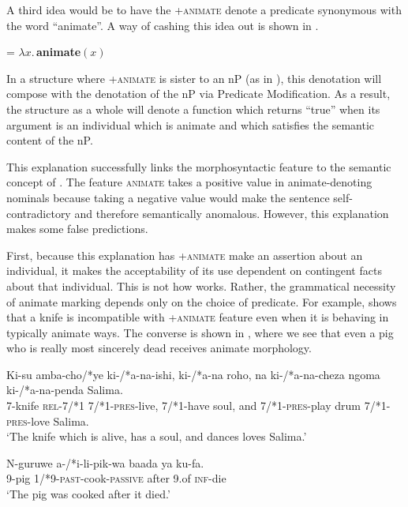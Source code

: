 \documentclass[output=paper,newtxmath,modfonts,nonflat,hidelinks]{langsci/langscibook}
\begin{document}
A third idea would be to have the +\textsc{animate} denote a predicate synonymous with the word ``animate''.  A way of cashing this idea out is shown in .

\ea\label{ex:pesetsky:lambdabdas}  = $\lambda x . \,$\textbf{animate}$(x)$ \z

In a structure where +\textsc{animate} is sister to an nP (as in ), this denotation will compose with the denotation of the nP via Predicate Modification.  As a result, the structure as a whole will denote a function which returns ``true'' when its argument is an individual which is animate and which satisfies the semantic content of the nP. 

This explanation successfully links the morphosyntactic  feature to the semantic concept of .  The feature \textsc{animate} takes a positive value in animate-denoting nominals because taking a negative value would make the sentence self-contradictory and therefore semantically anomalous.  However, this explanation makes some false predictions.

\largerpage
First, because this explanation has +\textsc{animate} make an assertion about an individual, it makes the acceptability of its use dependent on contingent facts about that individual.  This is not how  works.  Rather, the grammatical necessity of animate marking depends only on the choice of predicate. For example,  shows that a knife is incompatible with +\textsc{animate} feature even when it is behaving in typically animate ways.  The converse is shown in , where we see that even a pig who is really most sincerely dead receives animate morphology.

\ea\label{ex:pesetsky:dancingkisu} \gll Ki-su amba-cho/*ye ki-/*a-na-ishi, ki-/*a-na roho, na ki-/*a-na-cheza ngoma ki-/*a-na-penda Salima. \\    \textsc{7}-knife \textsc{rel}-\textsc{7}/*\textsc{1} \textsc{7}/*\textsc{1}-\textsc{pres}-live, \textsc{7}/*\textsc{1}-have soul, and \textsc{7}/*\textsc{1}-\textsc{pres}-play drum \textsc{7}/*\textsc{1}-\textsc{pres}-love Salima. \\  \glt `The knife which is alive, has a soul, and dances loves Salima.' \\ \z
   
\ea\label{ex:pesetsky:pikwapigga} \gll N-guruwe a-/*i-li-pik-wa baada ya ku-fa. \\   \textsc{9}-pig \textsc{1}/*\textsc{9}-\textsc{past}-cook-\textsc{passive} after \textsc{9}.of \textsc{inf}-die \\ \glt `The pig was cooked after it died.'  \\ \z 
\end{document}
